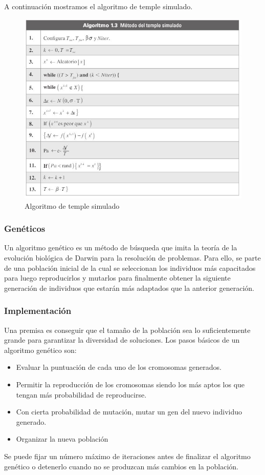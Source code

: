 \documentclass{article}
\begin{document}
A continuaci\'on mostramos el algoritmo de temple simulado.
\begin{figure}[h!]
    \centering
    \includegraphics[width=15cm]{imgs/templado_simulado.JPG}
    \caption{Algoritmo de temple simulado}
    \label{fig:my_label}
\end{figure}
\subsubsection{Gen\'eticos}
Un algoritmo genético es un método de búsqueda que imita la
teoría de la evolución biológica de Darwin para la resolución de
problemas. Para ello, se parte de una población inicial de la cual
se seleccionan los individuos más capacitados para luego
reproducirlos y mutarlos para finalmente obtener la siguiente
generación de individuos que estarán más adaptados que la
anterior generación.
\cite{D.Gutierrez,A.  Tapia,2020}
\subsubsection{Implementación}
Una premisa es conseguir que el tamaño de la población sea lo
suficientemente grande para garantizar la diversidad de
soluciones.
Los pasos básicos de un algoritmo genético son:
\begin{itemize}
\item Evaluar la puntuación de cada uno de los cromosomas
generados.
\item Permitir la reproducción de los cromosomas siendo los
más aptos los que tengan más probabilidad de
reproducirse.
\item Con cierta probabilidad de mutación, mutar un gen del
nuevo individuo generado.
\item Organizar la nueva población
\end{itemize}
Se puede fijar un número máximo de iteraciones
antes de finalizar el algoritmo genético o detenerlo cuando no se
produzcan más cambios en la población.
\end{document}
